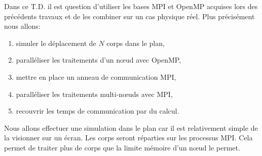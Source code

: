 Dans ce T.D. il est question d'utiliser les bases MPI et OpenMP acquises lors des précédents travaux et de les combiner sur un cas physique réel.
Plus précisément nous allons:
\begin{enumerate}
\item simuler le déplacement de $N$ corps dans le plan,
\item paralléliser les traitements d'un n\oe ud avec OpenMP,
\item mettre en place un anneau de communication MPI,
\item paralléliser les traitements multi-n\oe uds avec MPI,
\item recouvrir les temps de communication par du calcul.
\end{enumerate}

Nous allons effectuer une simulation dans le plan car il est relativement simple de la visionner sur un écran.
Les corps seront réparties sur les processus MPI. Cela permet de traiter plus de corps que la limite mémoire d'un n\oe ud le permet.
